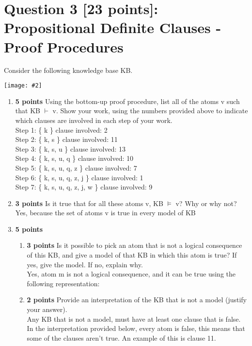 \documentclass{article}
\def\ans#1{{\color{ans}#1}}
\newcommand{\centerfig}[2]{\begin{center}\texttt{[image: \#2]}\end{center}}
\begin{document}
\section{Question 3 [23 points]: Propositional Definite Clauses - Proof Procedures}
Consider the following knowledge base KB.
\centerfig{0.2}{../figs/fig2}
\begin{enumerate}[label=(\alph*)]
    \item \textbf{5 points} Using the bottom-up proof procedure, list all of the atoms v such that KB $\vdash$ v. Show your work, using the numbers provided above to indicate which clauses are involved in each step of your work.\\
        \ans{
            Step 1:  \{ k \}  clause involved: 2 \\
            Step 2:  \{ k, s \}  clause involved: 11 \\
            Step 3:  \{ k, s, u \}  clause involved: 13 \\
            Step 4:  \{ k, s, u, q \}  clause involved: 10 \\
            Step 5:  \{ k, s, u, q, z \}  clause involved: 7 \\
            Step 6:  \{ k, s, u, q, z, j \}  clause involved: 1 \\
            Step 7:  \{ k, s, u, q, z, j, w \}  clause involved: 9 
        }
    \item \textbf{3 points} Is it true that for all these atoms v, KB $\vDash$ v? Why or why not?\\
        \ans{
          Yes, because the set of atoms v is true in every model of KB
        }
    \item \textbf{5 points}\\
    \begin{enumerate}[label=\roman*.]
        \item \textbf{3 points} Is it possible to pick an atom that is not a logical consequence of this KB, and give a model of that KB in which this atom is true? If yes, give the model. If no, explain why.\\
        \ans{
            Yes, atom m is not a logical consequence, and it can be true using the following representation:
        }
        \item \textbf{2 points} Provide an interpretation of the KB that is not a model (justify your answer).\\
        \ans{
            Any KB that is not a model, must have at least one clause that is false. In the interpretation provided below, every atom is false, this means that some of the clauses aren't true. An example of this is clause 11.
}
\end{enumerate}
\end{enumerate}
\end{document}
